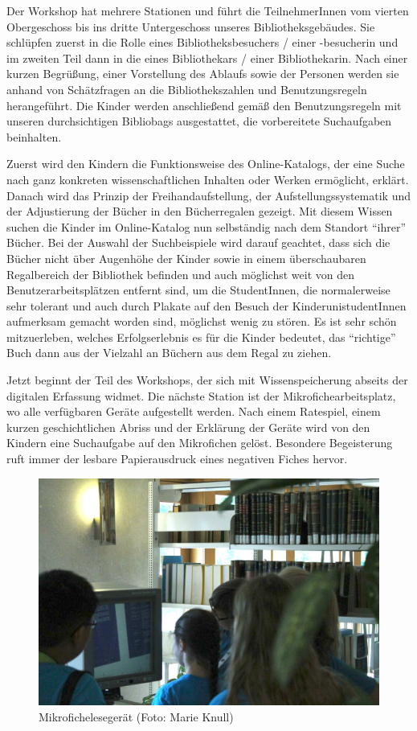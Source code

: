 \documentclass[a4paper,
fontsize=11pt,
oneside,
numbers=noperiodatend,
parskip=half-,
bibliography=totoc,
final
]{scrartcl}
\begin{document}
Der Workshop hat mehrere Stationen und führt die TeilnehmerInnen vom
vierten Obergeschoss bis ins dritte Untergeschoss unseres
Bibliotheksgebäudes. Sie schlüpfen zuerst in die Rolle eines
Bibliotheksbesuchers / einer -besucherin und im zweiten Teil dann in die
eines Bibliothekars / einer Bibliothekarin. Nach einer kurzen Begrüßung,
einer Vorstellung des Ablaufs sowie der Personen werden sie anhand von
Schätzfragen an die Bibliothekszahlen und Benutzungsregeln herangeführt.
Die Kinder werden anschließend gemäß den Benutzungsregeln mit unseren
durchsichtigen Bibliobags ausgestattet, die vorbereitete Suchaufgaben
beinhalten.

Zuerst wird den Kindern die Funktionsweise des Online-Katalogs, der eine
Suche nach ganz konkreten wissenschaftlichen Inhalten oder Werken
ermöglicht, erklärt. Danach wird das Prinzip der Freihandaufstellung,
der Aufstellungssystematik und der Adjustierung der Bücher in den
Bücherregalen gezeigt. Mit diesem Wissen suchen die Kinder im
Online-Katalog nun selbständig nach dem Standort \enquote{ihrer} Bücher.
Bei der Auswahl der Suchbeispiele wird darauf geachtet, dass sich die
Bücher nicht über Augenhöhe der Kinder sowie in einem überschaubaren
Regalbereich der Bibliothek befinden und auch möglichst weit von den
Benutzerarbeitsplätzen entfernt sind, um die StudentInnen, die
normalerweise sehr tolerant und auch durch Plakate auf den Besuch der
KinderunistudentInnen aufmerksam gemacht worden sind, möglichst wenig zu
stören. Es ist sehr schön mitzuerleben, welches Erfolgserlebnis es für
die Kinder bedeutet, das \enquote{richtige} Buch dann aus der Vielzahl
an Büchern aus dem Regal zu ziehen.

Jetzt beginnt der Teil des Workshops, der sich mit Wissenspeicherung
abseits der digitalen Erfassung widmet. Die nächste Station ist der
Mikrofichearbeitsplatz, wo alle verfügbaren Geräte aufgestellt werden.
Nach einem Ratespiel, einem kurzen geschichtlichen Abriss und der
Erklärung der Geräte wird von den Kindern eine Suchaufgabe auf den
Mikrofichen gelöst. Besondere Begeisterung ruft immer der lesbare
Papierausdruck eines negativen Fiches hervor.

\begin{figure}
\centering
\includegraphics{img/image_2.jpg}
\caption{Mikrofichelesegerät (Foto: Marie Knull)}
\end{figure}
\end{document}
